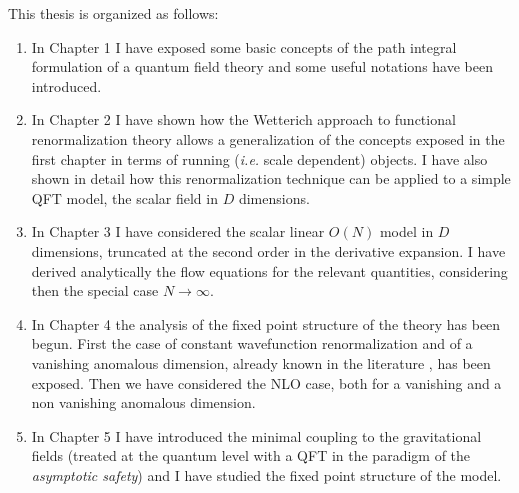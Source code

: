 This thesis is organized as follows:
\begin{enumerate}
 \item In Chapter 1 I have exposed some basic concepts of the path integral formulation of a quantum field theory and some useful notations have been introduced.
 \item In Chapter 2 I have shown how the Wetterich approach to functional renormalization theory allows a generalization of the concepts exposed in the first chapter
 in terms of running (\emph{i.e.} scale dependent) objects. I have also shown in detail how this renormalization technique can be applied to a simple QFT model, the scalar field in $D$ dimensions.
 \item In Chapter 3 I have considered the scalar linear $O(N)$ model in $D$ dimensions, truncated at the second order in the derivative expansion. I have derived analytically 
 the flow equations for the relevant quantities, considering then the special case $N\to\infty$.
 \item In Chapter 4 the analysis of the fixed point structure of the theory has been begun. First the case of constant wavefunction renormalization and of 
 a vanishing anomalous dimension, already known in the literature \cite{vaccascaling}, has been exposed. Then we have considered the NLO case, both for a vanishing and
 a non vanishing anomalous dimension. 
 \item In Chapter 5 I have introduced the minimal coupling to the gravitational fields 
(treated at the quantum level with a QFT in the paradigm of the 
\emph{asymptotic safety}) and I have studied the fixed point structure of the model.
\end{enumerate}
